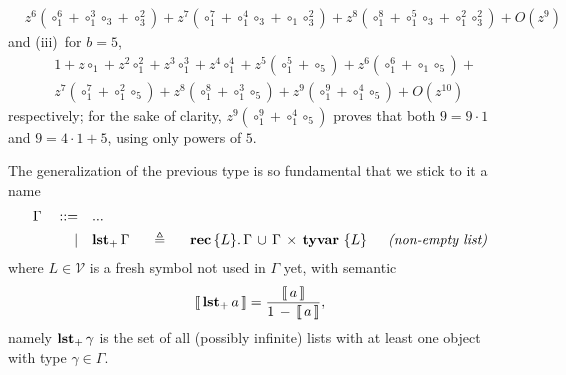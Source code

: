 \begin{example}
\begin{displaymath}
\begin{split}
&z^{6} \left({\circ}_{1}^{6} + {\circ}_{1}^{3} {\circ}_{3} + {\circ}_{3}^{2}\right) + z^{7} \left({\circ}_{1}^{7} + {\circ}_{1}^{4} {\circ}_{3} + {\circ}_{1} {\circ}_{3}^{2}\right) + z^{8} \left({\circ}_{1}^{8} + {\circ}_{1}^{5} {\circ}_{3} + {\circ}_{1}^{2} {\circ}_{3}^{2}\right) + O\left(z^{9}\right)
\end{split}
\end{displaymath}
and (iii)~for $b=5$,
\begin{displaymath}
\begin{split}
&1 + z {\circ}_{1} + z^{2} {\circ}_{1}^{2} + z^{3} {\circ}_{1}^{3} + z^{4} {\circ}_{1}^{4} + z^{5} \left({\circ}_{1}^{5} + {\circ}_{5}\right) + z^{6} \left({\circ}_{1}^{6} + {\circ}_{1} {\circ}_{5}\right) +\\
&z^{7} \left({\circ}_{1}^{7} + {\circ}_{1}^{2} {\circ}_{5}\right) + z^{8} \left({\circ}_{1}^{8} + {\circ}_{1}^{3} {\circ}_{5}\right) + z^{9} \left({\circ}_{1}^{9} + {\circ}_{1}^{4} {\circ}_{5}\right) + O\left(z^{10}\right)
\end{split}
\end{displaymath}
respectively; for the sake of clarity, $z^{9} \left({\circ}_{1}^{9} +
{\circ}_{1}^{4} {\circ}_{5}\right)$ proves that both $9 = 9\cdot1$ and $9 =
4\cdot1 + 5$, using only powers of $5$.
\end{example}

\begin{definition}
The generalization of the previous type is so fundamental that we stick to it a name
\begin{displaymath}
\begin{split}
    \Gamma\quad::=\quad&... \\
           |\quad&\tydef{\tynnlst{\Gamma}}{\tyrec{ \lbrace L \rbrace}{\tydu{\Gamma}{\tycp{\Gamma}{\tyvar{ \lbrace L \rbrace}}}}}{non-empty list}
\end{split}
\end{displaymath}
where $L\in\mathcal{V}$ is a fresh symbol not used in $\Gamma$ yet, with semantic
\begin{displaymath}
    \left\llbracket\,\textbf{lst}_{+}\,a\,\right\rrbracket = \frac{\left\llbracket\,a\,\right\rrbracket}{1\,-\,\left\llbracket\,a\,\right\rrbracket},
\end{displaymath}
namely $\textbf{lst}_{+}\,\gamma$ is the set of all (possibly infinite) lists with at least
one object with type $\gamma\in\Gamma$.
\end{definition}

